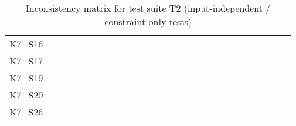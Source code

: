 \begin{table}[htpb]
\begin{tabular}{l|rrrrrrrrrrrrrrrrrrrrrrrrrr}
        K7\_S16 & \n & \n & \n & \e & \n & \n & \n & \n & \n & \n & \n & \n & \n & \n & \n & \n & \n & \n & \n & \n & \n & \n & \n & \n & \n & \n \\
        K7\_S17 & \n & \n & \n & \n & \n & \n & \n & \n & \e & \n & \n & \n & \n & \n & \n & \n & \n & \n & \n & \e & \e & \n & \e & \n & \n & \n \\
        K7\_S19 & \n & \n & \n & \n & \n & \n & \n & \n & \n & \n & \n & \n & \n & \n & \n & \n & \n & \n & \n & \n & \n & \n & \n & \n & \n & \n \\
        K7\_S20 & \n & \n & \n & \n & \n & \n & \n & \n & \n & \n & \n & \n & \n & \n & \n & \n & \n & \n & \n & \n & \n & \n & \n & \n & \n & \n \\
        K7\_S26 & \n & \n & \n & \n & \n & \n & \n & \n & \n & \n & \n & \n & \n & \n & \n & \n & \n & \n & \n & \n & \n & \n & \n & \n & \n & \n \\
        \bottomrule
    \end{tabular}
    \caption{Inconsistency matrix for test suite T2 (input-independent / constraint-only tests)}
    \label{tab:inconsistencies_matrix_constraint}
    \setlength{\tabcolsep}{\defaulttabcolsep}
\end{table}

